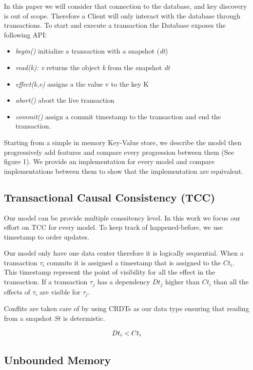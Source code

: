 \documentclass[parallelisme]{compas2022}
\begin{document}
In this paper we will consider that connection to the database, and key discovery is out of scope.
Therefore a Client will only interact with the database through transactions.
To start and execute a transaction the Database exposes the following API:
\begin{itemize}
\item \emph{begin()} initialize a transaction with a snapshot (\emph{dt})
\item \emph{read(k): v} returns the object \emph{k} from the snapshot \emph{dt}
\item \emph{effect(k,v)} assigns a the value v to the key K
\item \emph{abort()} abort the live transaction
\item \emph{commit()} assign a commit timestamp to the transaction and end the transaction.
\end{itemize}

Starting from a simple in memory Key-Value store, we describe the model then progressively add features and compare every progression between them (See figure 1).
We provide an implementation for every model and compare implementations between them to show that the implementation are equivalent.

\subsection{Transactional Causal Consistency (TCC)}

Our model can be provide multiple conssitency level.
In this work we focus our effort on TCC for every model.
To keep track of happened-before, we use timestamp to order updates.

Our model only have one data center therefore it is logically sequential.
When a transaction $\tau_i$ commits it is assigned a timestamp that is assigned to the $Ct_i$.
This timestamp represent the point of visibility for all the effect in the transaction.
If a transaction $\tau_j$ has a dependency $Dt_j$ higher than $Ct_i$ than all the effects of $\tau_i$ are visible for $\tau_j$.

Conflits are taken care of by using CRDTs as our data type ensuring that reading from a snapshot $St$ is determistic.

\[
  \begin{array}{lcl}
    \emph{$Dt_i < Ct_i$}
  \end{array} 
\]

\subsection{Unbounded Memory}
\end{document}
